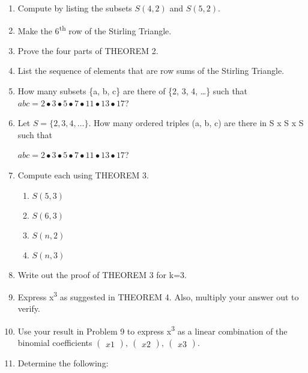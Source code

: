 \documentclass[10pt,letter]{article}
\begin{document}
\begin{enumerate}
\def\labelenumi{\arabic{enumi}.}

\item
  Compute by listing the subsets \(S(4,2)\) and \(S(5,2)\).
\item
  Make the 6\textsuperscript{th} row of the Stirling Triangle.
\item
  Prove the four parts of THEOREM 2.
\item
  List the sequence of elements that are row sums of the Stirling
  Triangle.
\item
  How many subsets \{a, b, c\} are there of \{2, 3, 4, \ldots{}\} such
  that
  \(abc = 2 \bullet 3 \bullet 5 \bullet 7 \bullet 11 \bullet 13 \bullet 17\)?
\item
  Let \(S = \{ 2,3,4,\ldots\}\). How many ordered triples (a, b, c) are
  there in S x S x S such that

\(abc = 2 \bullet 3 \bullet 5 \bullet 7 \bullet 11 \bullet 13 \bullet 17\)?
\item
  Compute each using THEOREM 3.

\begin{enumerate}
  \def\labelenumii{\alph{enumii}.}

  \item
    \(S\left( 5,3 \right)\)
  \item
    \(S(6,3)\)
  \item
    \(S(n,2)\)
  \item
    \(S(n,3)\)
  
\end{enumerate}
\item
  Write out the proof of THEOREM 3 for k=3.
\item
  Express x\textsuperscript{3} as suggested in THEOREM 4. Also, multiply
  your answer out to verify.
\item
  Use your result in Problem 9 to express x\textsuperscript{3} as a
  linear combination of the binomial coefficients \(

\begin{pmatrix}
  x 
  1 
  \end{pmatrix}
,\

\begin{pmatrix}
  x 
  2 
  \end{pmatrix}
,\

\begin{pmatrix}
  x 
  3 
  \end{pmatrix}
\).
\item
  Determine the following:


\end{enumerate}
\end{document}
